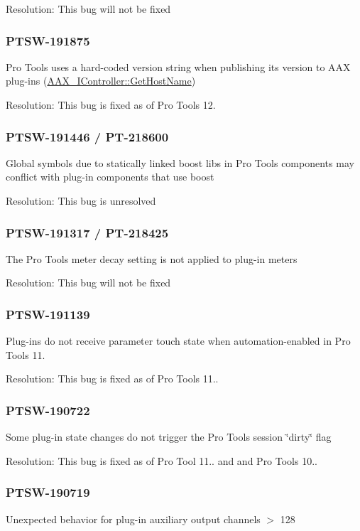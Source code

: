 Resolution\+: This bug will not be fixed\hypertarget{a00846_PTSW-191875}{}\subsubsection{P\+T\+S\+W-\/191875}\label{a00846_PTSW-191875}
Pro Tools uses a hard-\/coded version string when publishing its version to A\+AX plug-\/ins (\mbox{\hyperlink{a01789_ad2a002a133491b2ed572054588641e78}{A\+A\+X\+\_\+\+I\+Controller\+::\+Get\+Host\+Name}})

Resolution\+: This bug is fixed as of Pro Tools 12.\hypertarget{a00846_PTSW-191446}{}\subsubsection{P\+T\+S\+W-\/191446 / P\+T-\/218600}\label{a00846_PTSW-191446}
Global symbols due to statically linked boost libs in Pro Tools components may conflict with plug-\/in components that use boost

Resolution\+: This bug is unresolved\hypertarget{a00846_PTSW-191317}{}\subsubsection{P\+T\+S\+W-\/191317 / P\+T-\/218425}\label{a00846_PTSW-191317}
The Pro Tools meter decay setting is not applied to plug-\/in meters

Resolution\+: This bug will not be fixed\hypertarget{a00846_PTSW-191139}{}\subsubsection{P\+T\+S\+W-\/191139}\label{a00846_PTSW-191139}
Plug-\/ins do not receive parameter touch state when automation-\/enabled in Pro Tools 11.

Resolution\+: This bug is fixed as of Pro Tools 11..\hypertarget{a00846_PTSW-190722}{}\subsubsection{P\+T\+S\+W-\/190722}\label{a00846_PTSW-190722}
Some plug-\/in state changes do not trigger the Pro Tools session \char`\"{}dirty\char`\"{} flag

Resolution\+: This bug is fixed as of Pro Tool 11.. and and Pro Tools 10..\hypertarget{a00846_PTSW-190719}{}\subsubsection{P\+T\+S\+W-\/190719}\label{a00846_PTSW-190719}
Unexpected behavior for plug-\/in auxiliary output channels $>$ 128

